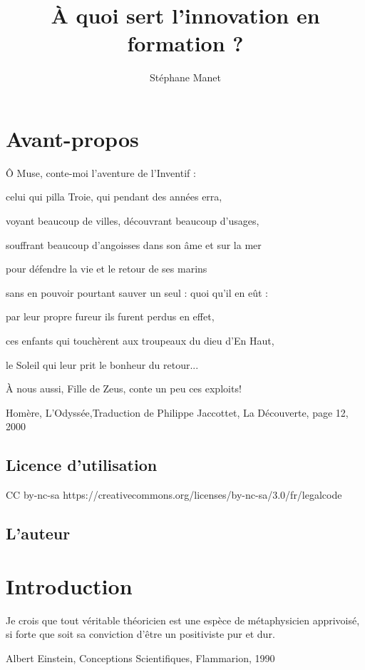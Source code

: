 \documentclass[a4paper, 11pt]{report}
\begin{document}
\title{À quoi sert l'innovation en formation ?}
\author{Stéphane Manet}
\date{} 
\maketitle

\begin{abstract}
\end{abstract}
\tableofcontents
\chapter*{Avant-propos}
\epigraph{Ô Muse, conte-moi l'aventure de l'Inventif :
	
	celui qui pilla Troie, qui pendant des années erra,
	
	voyant beaucoup de villes, découvrant beaucoup d'usages,
	
	souffrant beaucoup d'angoisses dans son âme et sur la mer
	
	pour défendre la vie et le retour de ses marins
	
	sans en pouvoir pourtant sauver un seul : quoi qu'il en eût :
	
	par leur propre fureur ils furent perdus en effet,
	
	ces enfants qui touchèrent aux troupeaux du dieu d'En Haut,
	
	le Soleil qui leur prit le bonheur du retour...
	
	À nous aussi, Fille de Zeus, conte un peu ces exploits!}{Homère, L'Odyssée,Traduction de Philippe Jaccottet, La Découverte, page 12, 2000}
\section*{Licence d'utilisation}
CC by-nc-sa
https://creativecommons.org/licenses/by-nc-sa/3.0/fr/legalcode
\section*{L'auteur}

\chapter{Introduction}
\epigraph{Je crois que tout véritable théoricien est une espèce de métaphysicien apprivoisé, si forte que soit sa conviction d'être un positiviste pur et dur.}{Albert Einstein, Conceptions Scientifiques, Flammarion, 1990}
\end{document}
